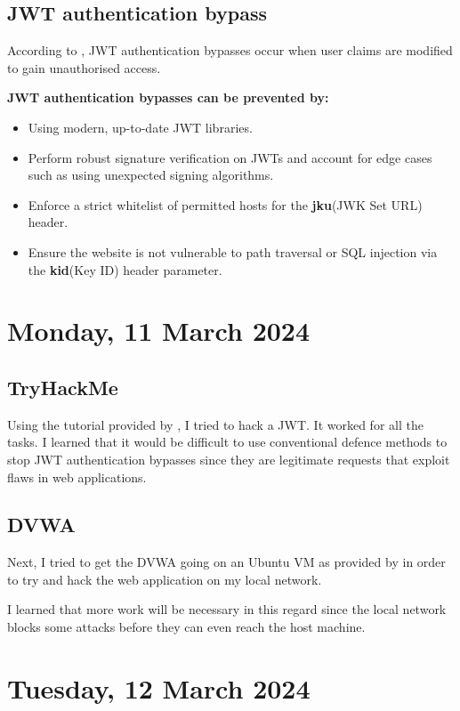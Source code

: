 \subsection{JWT authentication bypass}
According to \cite{JAB2022}, JWT authentication bypasses occur when user claims are modified to gain unauthorised access.

\textbf{JWT authentication bypasses can be prevented by:}
\begin{itemize}
    \item Using modern, up-to-date JWT libraries.
    \item Perform robust signature verification on JWTs and account for edge cases such as using unexpected signing algorithms.
    \item Enforce a strict whitelist of permitted hosts for the \textbf{jku}(JWK Set URL) header.
    \item Ensure the website is not vulnerable to path traversal or SQL injection via the \textbf{kid}(Key ID) header parameter.
\end{itemize}

\pendsign

\section[2024/03/11]{Monday, 11 March 2024}

\subsection{TryHackMe}
Using the tutorial provided by \cite{TRYHACKME}, I tried to hack a JWT. It worked for all the tasks. I learned that it would be difficult to use conventional defence methods to stop JWT authentication bypasses since they are legitimate requests that exploit flaws in web applications.

\subsection{DVWA}
Next, I tried to get the DVWA going on an Ubuntu VM as provided by \cite{DVWA} in order to try and hack the web application on my local network.

I learned that more work will be necessary in this regard since the local network blocks some attacks before they can even reach the host machine.

\pendsign

\section[2024/03/12]{Tuesday, 12 March 2024}

